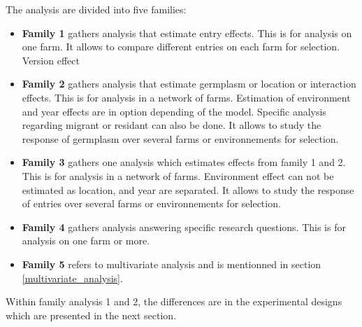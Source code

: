 \documentclass{book}\usepackage[]{graphicx}\usepackage[]{color}
\begin{document}
\noindent The analysis are divided into five families:
\begin{itemize}

\item \textbf{Family 1} gathers analysis that estimate entry effects. This is for analysis on one farm. 
It allows to compare different entries on each farm for selection.
Version effect

\item \textbf{Family 2} gathers analysis that estimate germplasm or location or interaction effects. This is for analysis in a network of farms. Estimation of environment and year effects are in option depending of the model. Specific analysis regarding migrant or residant can also be done.
It allows to study the response of germplasm over several farms or environnements for selection.

\item \textbf{Family 3} gathers one analysis which estimates effects from family 1 and 2. This is for analysis in a network of farms. Environment effect can not be estimated as location, and year are separated.
It allows to study the response of entries over several farms or environnements for selection.

\item \textbf{Family 4} gathers analysis answering specific research questions. 
This is for analysis on one farm or more.

\item \textbf{Family 5} refers to multivariate analysis and is mentionned in section \ref{multivariate_analysis}.

\end{itemize}

Within family analysis 1 and 2, the differences are in the experimental designs which are presented in the next section.
\end{document}

